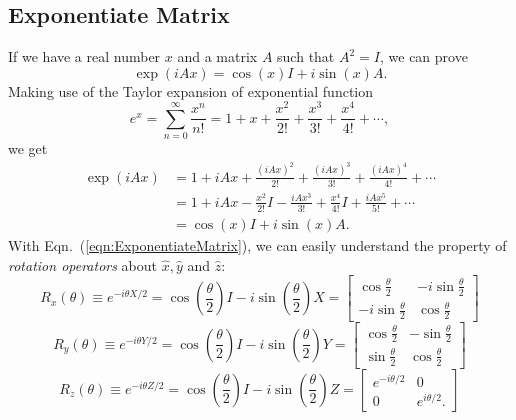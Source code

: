 \subsection{Exponentiate Matrix}
If we have a real number $x$ and a matrix $A$ such that $A^2=I$, we can prove
\begin{equation}
    \exp(iAx)=\cos(x)I+i\sin(x)A.
    \label{eqn:ExponentiateMatrix}
\end{equation}
Making use of the Taylor expansion of exponential function 
\begin{equation}
    e^x=\sum_{n=0}^{\infty}\frac{x^n}{n!}=1+x+\frac{x^2}{2!}+\frac{x^3}{3!}+\frac{x^4}{4!}+\cdots,
    \label{eqn:TaylorExp}
\end{equation}
we get
\begin{equation}
    \begin{split}
        \exp(iAx)&=1+iAx+\frac{(iAx)^2}{2!}+\frac{(iAx)^3}{3!}+\frac{(iAx)^4}{4!}+\cdots\\
        &=1+iAx-\frac{x^2}{2!}I-\frac{iAx^3}{3!}+\frac{x^4}{4!}I+\frac{iAx^5}{5!}+\cdots\\
        &=\cos(x)I+i\sin(x)A.
    \end{split}
\end{equation}
With Eqn.~(\ref{eqn:ExponentiateMatrix}), we can easily understand the property of \textit{rotation operators} about $\hat{x},\hat{y}$ and $\hat{z}$:
\begin{equation}
    R_x(\theta)\equiv e^{-i\theta X/2}=\cos\left(\frac{\theta}{2}\right)I-i\sin\left(\frac{\theta}{2}\right)X=\begin{bmatrix}
        \cos\frac{\theta}{2}&-i\sin\frac{\theta}{2}\\-i\sin\frac{\theta}{2}&\cos\frac{\theta}{2}
    \end{bmatrix}
\end{equation}
\begin{equation}
    R_y(\theta)\equiv e^{-i\theta Y/2}=\cos\left(\frac{\theta}{2}\right)I-i\sin\left(\frac{\theta}{2}\right)Y=\begin{bmatrix}
        \cos\frac{\theta}{2}&-\sin\frac{\theta}{2}\\\sin\frac{\theta}{2}&\cos\frac{\theta}{2}
    \end{bmatrix}
\end{equation}
\begin{equation}
    R_z(\theta)\equiv e^{-i\theta Z/2}=\cos\left(\frac{\theta}{2}\right)I-i\sin\left(\frac{\theta}{2}\right)Z=\begin{bmatrix}
        e^{-i\theta/2}&0\\0&e^{i\theta/2}.
    \end{bmatrix}
\end{equation}
